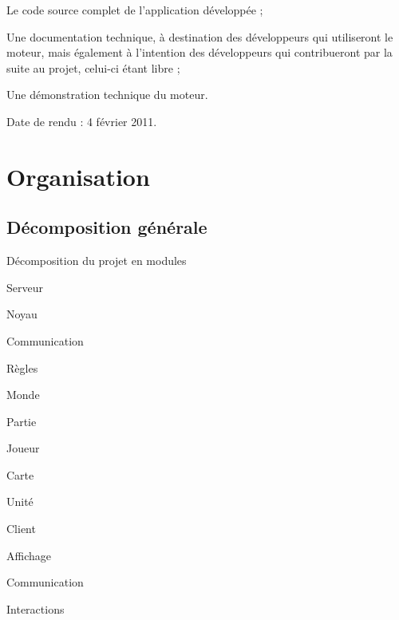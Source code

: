 \documentclass[a4paper,10pt]{report}
\begin{document}
    \begin{list}{-}{}
      \item{Le code source complet de l'application développée ;}
      \item{Une documentation technique, à destination des développeurs qui utiliseront le moteur, mais également à l'intention des développeurs qui contribueront par la suite au projet, celui-ci étant libre ;}
      \item{Une démonstration technique du moteur.}
    \end{list}

    Date de rendu : 4 février 2011.



  \chapter{Organisation}

    \section{Décomposition générale}

      Décomposition du projet en modules

      \begin{list}{-}{}
        \item{Serveur}
        \begin{list}{-}{}
          \item{Noyau}
          \begin{list}{-}{}
            \item{Communication}
            \item{Règles}
          \end{list}
          \item{Monde}
          \begin{list}{-}{}
            \item{Partie}
            \item{Joueur}
            \item{Carte}
            \item{Unité}
          \end{list}
        \end{list}

        \item{Client}
        \begin{list}{-}{}
          \item{Affichage}
          \item{Communication}
          \item{Interactions}
        \end{list}
      \end{list}
\end{document}
